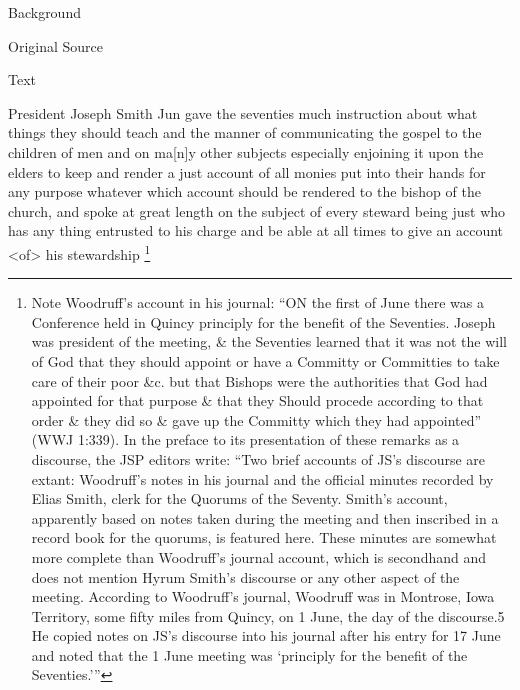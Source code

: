 				\begin{description}
					\item[Background]
				\end{description}
				
				
				\begin{description}
					\item[Original Source]
				\end{description}
				
				
				\begin{description}
					\item[Text]
				\end{description}
				
					President Joseph Smith Jun gave the seventies much instruction about what things they should teach and the manner of communicating the gospel to the children of men and on ma[n]y other subjects especially enjoining it upon the elders to keep and render a just account of all monies put into their hands for any purpose whatever which account should be rendered to the bishop of the church, and spoke at great length on the subject of every steward being just who has any thing entrusted to his charge and be able at all times to give an account <of> his stewardship%
						\footnote{%
							Note Woodruff's account in his journal: ``ON the first of June there was a Conference held in Quincy principly for the benefit of the Seventies. Joseph was president of the meeting, \& the Seventies learned that it was not the will of God that they should appoint or have a Committy or Committies to take care of their poor \&c. but that Bishops were the authorities that God had appointed for that purpose \& that they Should procede according to that order \& they did so \& gave up the Committy which they had appointed'' (WWJ 1:339). In the preface to its presentation of these remarks as a discourse, the JSP editors write: ``Two brief accounts of JS's discourse are extant: Woodruff's notes in his journal and the official minutes recorded by Elias Smith, clerk for the Quorums of the Seventy. Smith's account, apparently based on notes taken during the meeting and then inscribed in a record book for the quorums, is featured here. These minutes are somewhat more complete than Woodruff's journal account, which is secondhand and does not mention Hyrum Smith's discourse or any other aspect of the meeting. According to Woodruff's journal, Woodruff was in Montrose, Iowa Territory, some fifty miles from Quincy, on 1 June, the day of the discourse.5 He copied notes on JS's discourse into his journal after his entry for 17 June and noted that the 1 June meeting was `principly for the benefit of the Seventies.'''
							}
							
